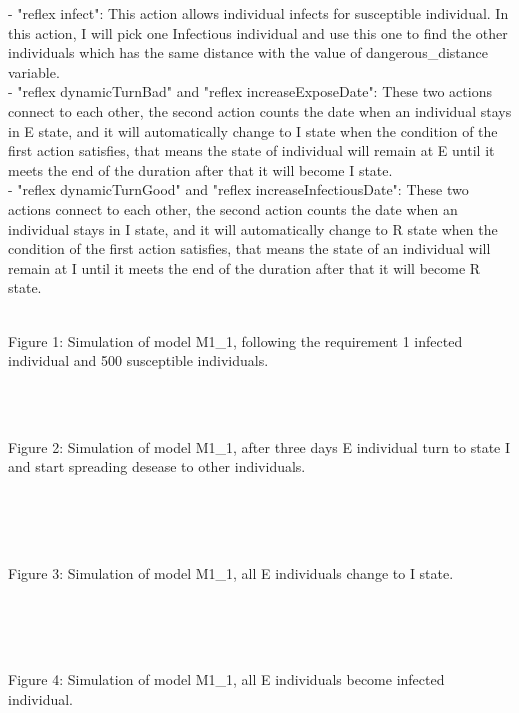 \documentclass{article}
\begin{document}
- "reflex infect": This action allows individual infects for susceptible individual. In this action, I will pick one Infectious individual and use this one to find the other individuals which has the same distance with the value of dangerous\_distance variable.
\\
- "reflex dynamicTurnBad" and "reflex increaseExposeDate": These two actions connect to each other, the second action counts the date when an individual stays in E state, and it will automatically change to I state when the condition of the first action satisfies, that means the state of individual will remain at E until it meets the end of the duration after that it will become I state.
\\
- "reflex dynamicTurnGood" and "reflex increaseInfectiousDate": These two actions connect to each other, the second action counts the date when an individual stays in I state, and it will automatically change to R state when the condition of the first action satisfies, that means the state of an individual will remain at I until it meets the end of the duration after that it will become R state.
\\
\begin{pic1}
\\
\caption{Figure 1: Simulation of model M1\_1, following the requirement 1 infected individual and 500 susceptible individuals.}
\end{pic1}
\\
\begin{pic2}
\\
\caption{Figure 2: Simulation of model M1\_1, after three days E individual turn to state I and start spreading desease to other individuals.}
\end{pic2}
\\\\
\begin{pic3}
\\
\caption{Figure 3: Simulation of model M1\_1, all E individuals change to I state.}
\end{pic3}
\\\\
\begin{pic4}
\\
\caption{Figure 4: Simulation of model M1\_1, all E individuals become infected individual.}
\end{pic4}
\end{document}
